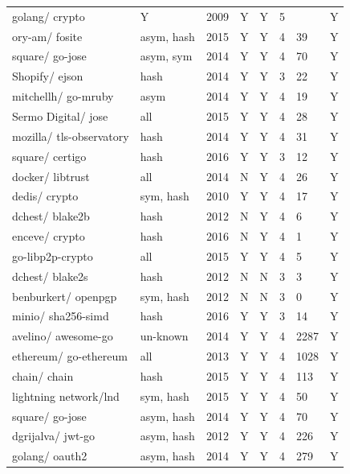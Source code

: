 \documentclass[
  digital, %
  notable,   %
  lof,     %
  lot,     %
]{fithesis3}
\begin{document}
\begin{center}
\begin{longtable}[th]{|P{1.6cm}P{1cm}P{1cm}P{1cm}P{1.3cm}P{1.3cm}P{1.2cm}P{1.1cm}|}
golang/ crypto & Y & 2009 & Y & Y & 5 &  & Y\\ 
ory-am/ fosite & asym, hash & 2015 & Y & Y & 4 & 39 & Y \\
square/ go-jose & asym, sym & 2014 & Y & Y & 4 & 70 & Y \\
Shopify/ ejson & hash & 2014 & Y & Y & 3 & 22 & Y \\
mitchellh/ go-mruby & asym & 2014 & Y & Y & 4 & 19 & Y \\
Sermo Digital/ jose & all & 2015 & Y & Y & 4 & 28 & Y \\
mozilla/ tls-observatory & hash & 2014 & Y & Y & 4 & 31 & Y \\
square/ certigo & hash & 2016 & Y & Y & 3 & 12 & Y \\
docker/ libtrust & all & 2014 & N & Y & 4 & 26 & Y \\
dedis/ crypto & sym, hash & 2010 & Y & Y & 4 & 17 & Y \\
dchest/ blake2b & hash & 2012 & N & Y & 4 & 6 & Y \\
enceve/ crypto & hash & 2016 & N & Y & 4 & 1 & Y \\
go-libp2p-crypto & all & 2015 & Y & Y & 4 & 5 & Y \\ 
dchest/ blake2s & hash & 2012 & N & N & 3 & 3 & Y \\
benburkert/ openpgp & sym, hash & 2012 & N & N & 3 & 0 & Y \\
minio/ sha256-simd & hash & 2016 & Y & Y & 3 & 14 & Y \\
avelino/ awesome-go & un-known & 2014 & Y & Y & 4 & 2287 & Y \\
ethereum/ go-ethereum & all & 2013 & Y & Y & 4 & 1028 & Y \\
chain/ chain & hash & 2015 & Y & Y & 4 & 113 & Y \\
lightning network/lnd & sym, hash & 2015 & Y & Y & 4 & 50 & Y \\
square/ go-jose & asym, hash & 2014 & Y & Y & 4 & 70 & Y \\
dgrijalva/ jwt-go & asym, hash & 2012 & Y & Y & 4 & 226 & Y \\
golang/ oauth2 & asym, hash & 2014 & Y & Y & 4 & 279 & Y  
\end{longtable}
\end{center}


\printbibliography
\end{document}
